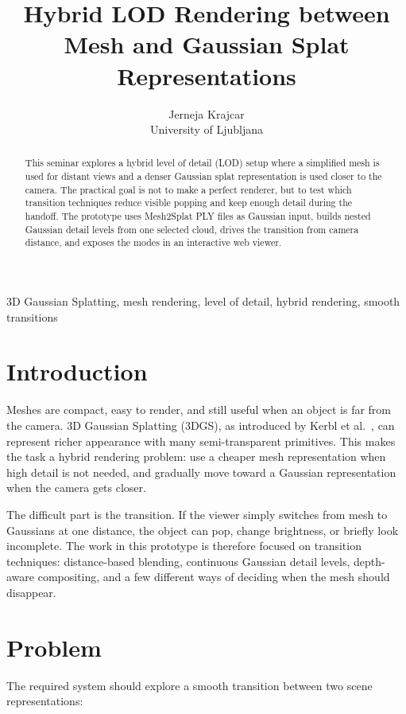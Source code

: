 \documentclass{egpubl}
\title[Mesh-to-Gaussian LOD Transition]{Hybrid LOD Rendering between Mesh and Gaussian Splat Representations}
\author[J. Krajcar]
{Jerneja Krajcar\\
University of Ljubljana}
\begin{document}
\maketitle

\begin{abstract}
This seminar explores a hybrid level of detail (LOD) setup where a simplified mesh is used
for distant views and a denser Gaussian splat representation is used closer to the camera.
The practical goal is not to make a perfect renderer, but to test which transition techniques
reduce visible popping and keep enough detail during the handoff. The prototype uses Mesh2Splat PLY files as
Gaussian input, builds nested Gaussian detail levels from one selected cloud,
drives the transition from camera distance, and exposes the modes in an interactive web viewer.
\end{abstract}

\begin{keywords}
3D Gaussian Splatting, mesh rendering, level of detail, hybrid rendering, smooth transitions
\end{keywords}

\section{Introduction}

Meshes are compact, easy to render, and still useful when an object is far from the camera.
3D Gaussian Splatting (3DGS), as introduced by Kerbl et al.~\cite{kerbl2023gaussian}, can represent richer
appearance with many semi-transparent primitives. This makes the task a hybrid rendering problem:
use a cheaper mesh representation when high detail is not needed, and gradually move toward a Gaussian representation
when the camera gets closer.

The difficult part is the transition. If the viewer simply switches from mesh to Gaussians at one distance,
the object can pop, change brightness, or briefly look incomplete. The work in this prototype is therefore
focused on transition techniques: distance-based blending, continuous Gaussian detail levels,
depth-aware compositing, and a few different ways of deciding when the mesh should disappear.

\section{Problem}

The required system should explore a smooth transition between two scene representations:
\end{document}

